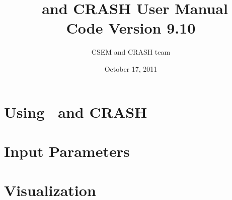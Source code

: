 \documentclass[twoside,10pt]{book}
\title{\BATSRUS\ and CRASH User Manual \\ \large Code Version 9.10}
\author{CSEM and CRASH team}
\date{October 17, 2011}
\begin{document}
\pagestyle{fancy}
\lhead[\fancyplain{}{\bfseries\thepage}]{\fancyplain{}{\bfseries\rightmark}}
\rhead[\fancyplain{}{\bfseries\leftmark}]{\fancyplain{}{\bfseries\thepage}}
\cfoot{}

\maketitle

\tableofcontents



\chapter{Using \BATSRUS\ and CRASH \label{chapter:usage}}





\chapter{Input Parameters \label{chapter:param}}






\chapter{Visualization \label{chapter:visualization}}





%
\end{document}
